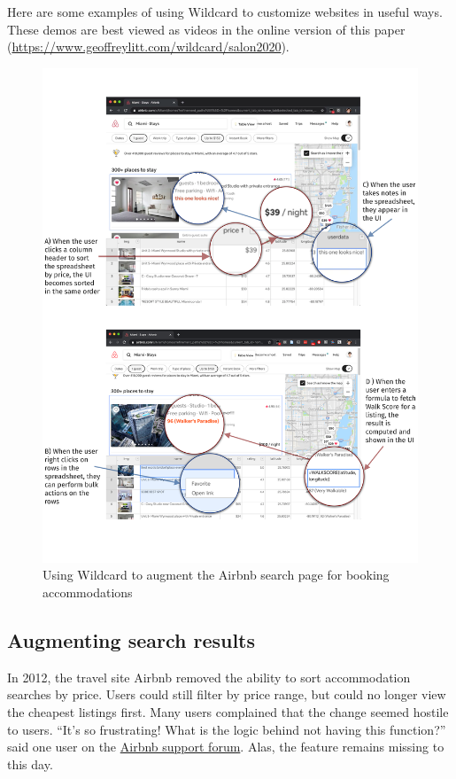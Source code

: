 \documentclass[english]{programming}
\begin{document}
Here are some examples of using Wildcard to customize websites in useful
ways.{ These demos are best viewed as videos in the online version of
this paper (\url{https://www.geoffreylitt.com/wildcard/salon2020}).}

\begin{figure}
\hypertarget{fig:airbnb-demo}{%
\centering
\includegraphics{media/airbnb-demo-300dpi.png}
\caption{Using Wildcard to augment the Airbnb search page for booking
accommodations}\label{fig:airbnb-demo}
}
\end{figure}

\hypertarget{augmenting-search-results}{%
\subsection{Augmenting search results}\label{augmenting-search-results}}

In 2012, the travel site Airbnb removed the ability to sort
accommodation searches by price. Users could still filter by price
range, but could no longer view the cheapest listings first. Many users
complained that the change seemed hostile to users. ``It's so
frustrating! What is the logic behind not having this function?'' said
one user on the
\href{https://community.withairbnb.com/t5/Hosting/Sorting-listing-by-price/td-p/559404}{Airbnb
support forum}. Alas, the feature remains missing to this day.
\end{document}
